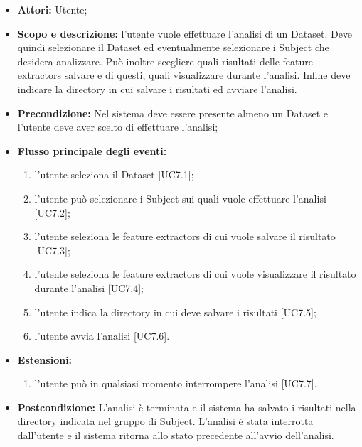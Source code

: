 \begin{itemize}
\item \textbf{Attori:} Utente;
\item \textbf{Scopo e descrizione:} l'utente vuole effettuare l'analisi di un Dataset\glossario{}. Deve quindi selezionare il Dataset\glossario{} ed eventualmente selezionare i Subject\glossario{} che desidera analizzare. Può inoltre scegliere quali risultati delle feature extractors\glossario{} salvare e di questi, quali visualizzare durante l'analisi. Infine deve indicare la directory in cui salvare i risultati ed avviare l'analisi.
\item \textbf{Precondizione:} Nel sistema deve essere presente almeno un Dataset\glossario{} e l'utente deve aver scelto di effettuare l'analisi;
\item \textbf{Flusso principale degli eventi:}
\begin{enumerate}
	\item l'utente seleziona il Dataset\glossario{} [UC7.1];
	\item l'utente può selezionare i Subject\glossario{} sui quali vuole effettuare l'analisi [UC7.2];
	\item l'utente seleziona le feature extractors\glossario{} di cui vuole salvare il risultato [UC7.3];
	\item l'utente seleziona le feature extractors\glossario{} di cui vuole visualizzare il risultato durante l'analisi [UC7.4];
	\item l'utente indica la directory in cui \project{} deve salvare i risultati [UC7.5];
	\item l'utente avvia l'analisi [UC7.6].
\end{enumerate}
\item \textbf{Estensioni:}
\begin{enumerate}
	\item l'utente può in qualsiasi momento interrompere l'analisi [UC7.7].
\end{enumerate}
\item \textbf{Postcondizione:} L'analisi è terminata e il sistema ha salvato i risultati nella directory indicata nel gruppo di Subject\glossario{}. L'analisi è stata interrotta dall'utente e il sistema ritorna allo stato precedente all'avvio dell'analisi.
\end{itemize}


